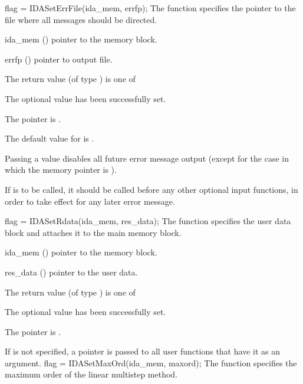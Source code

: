 {
flag = IDASetErrFile(ida\_mem, errfp);
}
{
  The function  specifies the pointer to the file
  where all {\ida} messages should be directed.
}
{
  \begin{args}
  \item[ida\_mem] ()
    pointer to the {\ida} memory block.
  \item[errfp] ()
    pointer to output file.
  \end{args}
}
{
  The return value  (of type ) is one of
  \begin{args}
  \item[\Id{IDA\_SUCCESS}] 
    The optional value has been successfully set.
  \item[\Id{IDA\_MEM\_NULL}]
    The  pointer is .
  \end{args}
}
{
  The default value for  is .

  Passing a value  disables all future error message output
  (except for the case in which the {\ida} memory pointer is ).

  {\warn} If  is to be called, it should be called before any
  other optional input functions, in order to take effect for any later error message.
}
{
  flag = IDASetRdata(ida\_mem, res\_data);
}
{
  The function  specifies the user data block 
  and attaches it to the main {\ida} memory block.
}
{
  \begin{args}
  \item[ida\_mem] ()
    pointer to the {\ida} memory block.
  \item[res\_data] ()
    pointer to the user data.
  \end{args}
}
{
  The return value  (of type ) is one of
  \begin{args}
  \item[\Id{IDA\_SUCCESS}] 
    The optional value has been successfully set.
  \item[\Id{IDA\_MEM\_NULL}]
    The  pointer is .
  \end{args}
}
{
  If  is not specified, a  pointer is
  passed to all user functions that have it as an argument.
}
{
flag = IDASetMaxOrd(ida\_mem, maxord);
}
{
  The function  specifies the maximum order of the 
  linear multistep method.
}
